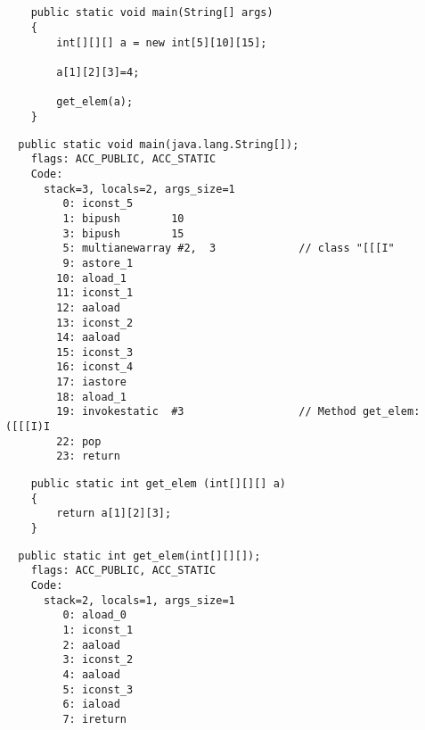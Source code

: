 \subsection{}


\begin{lstlisting}
	public static void main(String[] args)
	{
		int[][][] a = new int[5][10][15];

		a[1][2][3]=4;

		get_elem(a);
	}
\end{lstlisting}

\begin{lstlisting}
  public static void main(java.lang.String[]);
    flags: ACC_PUBLIC, ACC_STATIC
    Code:
      stack=3, locals=2, args_size=1
         0: iconst_5      
         1: bipush        10
         3: bipush        15
         5: multianewarray #2,  3             // class "[[[I"
         9: astore_1      
        10: aload_1       
        11: iconst_1      
        12: aaload        
        13: iconst_2      
        14: aaload        
        15: iconst_3      
        16: iconst_4      
        17: iastore       
        18: aload_1       
        19: invokestatic  #3                  // Method get_elem:([[[I)I
        22: pop           
        23: return        
\end{lstlisting}


\begin{lstlisting}
	public static int get_elem (int[][][] a)
	{
		return a[1][2][3];
	}
\end{lstlisting}

\begin{lstlisting}
  public static int get_elem(int[][][]);
    flags: ACC_PUBLIC, ACC_STATIC
    Code:
      stack=2, locals=1, args_size=1
         0: aload_0       
         1: iconst_1      
         2: aaload        
         3: iconst_2      
         4: aaload        
         5: iconst_3      
         6: iaload        
         7: ireturn       
\end{lstlisting}
